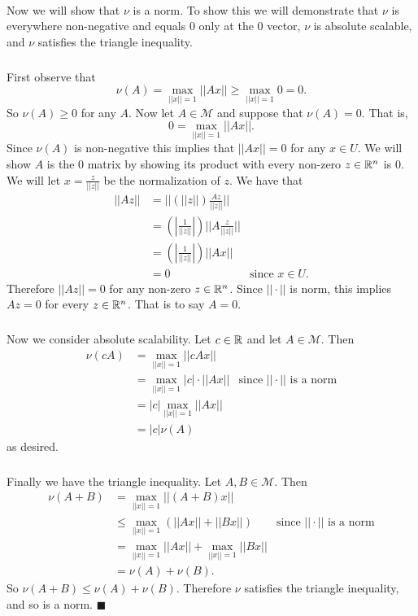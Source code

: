 \documentclass[letterpaper,12pt,oneside,onecolumn]{article}
\newcommand{\cM}{\mathcal{M}} \newcommand{\cN}{\mathcal{N}}
\begin{document}
\paragraph{}
Now we will show that $\nu$ is a norm. To show this we will demonstrate that $\nu$ is everywhere non-negative and equals $0$ only at the $0$ vector, $\nu$ is absolute scalable, and $\nu$ satisfies the triangle inequality.
\subparagraph{}
First observe that
$$\nu(A) = \max_{||x||=1} ||Ax|| \geq \max_{||x||=1} 0 = 0.$$
So $\nu(A) \geq 0$ for any $A$. Now let $A \in \cM$ and suppose that $\nu(A) = 0$. That is,
$$0 = \max_{||x|| = 1} ||Ax||.$$
Since $\nu(A)$ is non-negative this implies that $||Ax|| = 0$ for any $x \in U$.
We will show $A$ is the $0$ matrix by showing its product with every non-zero $z \in \mathbb{R}^n$ is $0$. We will let $x = \frac{z}{||z||}$ be the normalization of $z$. We have that
\begin{align*}
||Az|| &= ||(||z||)\frac{Az}{||z||}|| \\
&=(|\frac{1}{||z||}|) ||A\frac{z}{||z||}|| \\
&= (|\frac{1}{||z||}|)||Ax|| \\
&= 0 &\text{since $x \in U$}.
\end{align*}
Therefore $||Az|| = 0$ for any non-zero $z \in \mathbb{R}^n$. Since $||\cdot||$ is norm, this implies $Az = 0$ for every $z \in \mathbb{R}^n$. That is to say $A=0$.
\subparagraph{}
Now we consider absolute scalability. Let $c \in \mathbb{R}$ and let $A \in \cM$. Then
\begin{align*}
\nu(cA) &= \max_{||x||=1} ||cAx|| \\
&= \max_{||x||=1} |c|\cdot||Ax|| &\text{since $||\cdot||$ is a norm}\\
&= |c| \max_{||x||=1} ||Ax|| \\
&= |c| \nu(A)
\end{align*}
as desired.
\subparagraph{}
Finally we have the triangle inequality. Let $A,B \in \cM$. Then
\begin{align*}
\nu(A + B) &= \max_{||x||=1} ||(A+B)x|| \\
&\leq \max_{||x||=1} (||Ax|| + ||Bx||) &\text{since $||\cdot||$ is a norm}\\
&= \max_{||x||=1} ||Ax|| + \max_{||x||=1} ||Bx|| \\
&= \nu(A) + \nu(B).
\end{align*}
So $\nu(A+B) \leq \nu(A) + \nu(B)$. Therefore $\nu$ satisfies the triangle inequality, and so is a norm. $\blacksquare$
\end{document}
